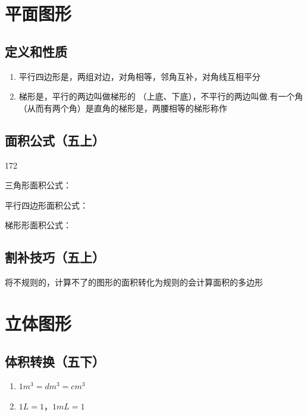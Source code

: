 \section*{平面图形}
\subsection*{定义和性质}
\begin{enumerate}
    \item 平行四边形是，两组对边，对角相等，邻角互补，对角线互相平分
    \item 梯形是，平行的两边叫做梯形的 （上底、下底），不平行的两边叫做.有一个角（从而有两个角）是直角的梯形是，两腰相等的梯形称作
\end{enumerate}

\subsection*{面积公式（五上）}
\begin{dingautolist}{172}
    \item 三角形面积公式：
    \item 平行四边形面积公式：
    \item 梯形形面积公式：
\end{dingautolist}
\subsection*{割补技巧（五上）}
将不规则的，计算不了的图形的面积转化为规则的会计算面积的多边形

\section*{立体图形}
\subsection*{体积转换（五下）}
\begin{enumerate}
    \item $1 m^3 = $$dm^3 = $$cm^3$
    \item $1L = 1$，$1mL = 1$
\end{enumerate}
